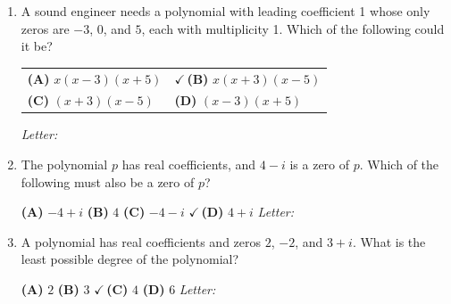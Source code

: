 \documentclass[10pt]{article}
\begin{document}
\begin{enumerate}[leftmargin=1.9em, itemsep=12pt]

\item A sound engineer needs a polynomial with leading coefficient 1 whose only zeros are
      $-3$, $0$, and $5$, each with multiplicity 1. Which of the following could it be?

      \smallskip
      \begin{tabular}{@{}p{4.2cm}p{4.2cm}@{}}
      \textbf{(A)} $x(x - 3)(x + 5)$ & {\color{keyred}\textbf{$\checkmark$\,(B)}} $x(x + 3)(x - 5)$ \\[2pt]
      \textbf{(C)} $(x + 3)(x - 5)$ & \textbf{(D)} $(x - 3)(x + 5)$
      \end{tabular}
      \hfill\textit{Letter:}~\gradedblank[id=ap1, type=choice, points=1, answer=B]{0.42in}{13pt}

\item The polynomial $p$ has real coefficients, and $4 - i$ is a zero of $p$. Which of the
      following must also be a zero of $p$?

      \smallskip
      \textbf{(A)} $-4 + i$ \hspace{2.2em} \textbf{(B)} $4$ \hspace{2.2em} \textbf{(C)} $-4 - i$ \hspace{2.2em} {\color{keyred}\textbf{$\checkmark$\,(D)}} $4 + i$ \hfill\textit{Letter:}~\gradedblank[id=ap2, type=choice, points=1, answer=D]{0.42in}{13pt}

\item A polynomial has real coefficients and zeros $2$, $-2$, and $3 + i$. What is the least
      possible degree of the polynomial?

      \smallskip
      \textbf{(A)} $2$ \hspace{2.2em} \textbf{(B)} $3$ \hspace{2.2em} {\color{keyred}\textbf{$\checkmark$\,(C)}} $4$ \hspace{2.2em} \textbf{(D)} $6$ \hfill\textit{Letter:}~\gradedblank[id=ap3, type=choice, points=1, answer=C]{0.42in}{13pt}


\end{enumerate}
\end{document}

